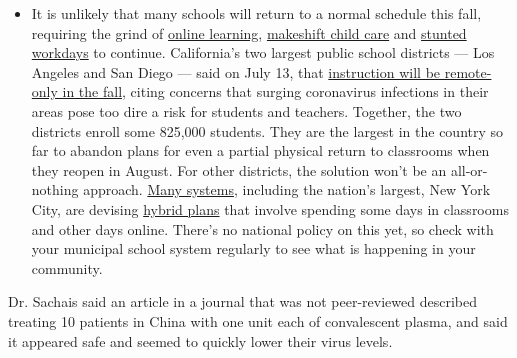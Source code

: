 \begin{itemize}
  \begin{itemize}
  \tightlist
  \item
    It is unlikely that many schools will return to a normal schedule
    this fall, requiring the grind of
    \href{https://www.nytimes.com/2020/06/05/us/coronavirus-education-lost-learning.html?action=click\&pgtype=Article\&state=default\&region=MAIN_CONTENT_3\&context=storylines_faq}{online
    learning},
    \href{https://www.nytimes.com/2020/05/29/us/coronavirus-child-care-centers.html?action=click\&pgtype=Article\&state=default\&region=MAIN_CONTENT_3\&context=storylines_faq}{makeshift
    child care} and
    \href{https://www.nytimes.com/2020/06/03/business/economy/coronavirus-working-women.html?action=click\&pgtype=Article\&state=default\&region=MAIN_CONTENT_3\&context=storylines_faq}{stunted
    workdays} to continue. California's two largest public school
    districts --- Los Angeles and San Diego --- said on July 13, that
    \href{https://www.nytimes.com/2020/07/13/us/lausd-san-diego-school-reopening.html?action=click\&pgtype=Article\&state=default\&region=MAIN_CONTENT_3\&context=storylines_faq}{instruction
    will be remote-only in the fall}, citing concerns that surging
    coronavirus infections in their areas pose too dire a risk for
    students and teachers. Together, the two districts enroll some
    825,000 students. They are the largest in the country so far to
    abandon plans for even a partial physical return to classrooms when
    they reopen in August. For other districts, the solution won't be an
    all-or-nothing approach.
    \href{https://bioethics.jhu.edu/research-and-outreach/projects/eschool-initiative/school-policy-tracker/}{Many
    systems}, including the nation's largest, New York City, are
    devising
    \href{https://www.nytimes.com/2020/06/26/us/coronavirus-schools-reopen-fall.html?action=click\&pgtype=Article\&state=default\&region=MAIN_CONTENT_3\&context=storylines_faq}{hybrid
    plans} that involve spending some days in classrooms and other days
    online. There's no national policy on this yet, so check with your
    municipal school system regularly to see what is happening in your
    community.
  \end{itemize}
\end{itemize}

Dr. Sachais said an article in a journal that was not peer-reviewed
described treating 10 patients in China with one unit each of
convalescent plasma, and said it appeared safe and seemed to quickly
lower their virus levels.

